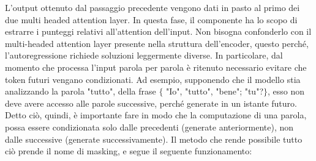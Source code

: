 L'output ottenuto dal passaggio precedente vengono dati in pasto al primo dei due multi headed attention layer. In questa fase, il componente ha lo scopo di estrarre i punteggi relativi all'attention dell'input.
Non bisogna confonderlo con il multi-headed attention layer presente nella struttura dell'encoder, questo perché, l'autoregressione richiede soluzioni leggermente diverse. In particolare, dal momento che processa l'input parola per parola è ritenuto necessario evitare che token futuri vengano condizionati. Ad esempio, supponendo che il modello stia analizzando la parola "tutto", della frase $\{$ "Io", "tutto", "bene"; "tu"?$\}$, esso non deve avere accesso alle parole successive, perché generate in un istante futuro. Detto ciò, quindi, è importante fare in modo che la computazione di una parola, possa essere condizionata solo dalle precedenti (generate anteriormente), non dalle successive (generate successivamente).
Il metodo che rende possibile tutto ciò prende il nome di masking, e segue il seguente funzionamento:
